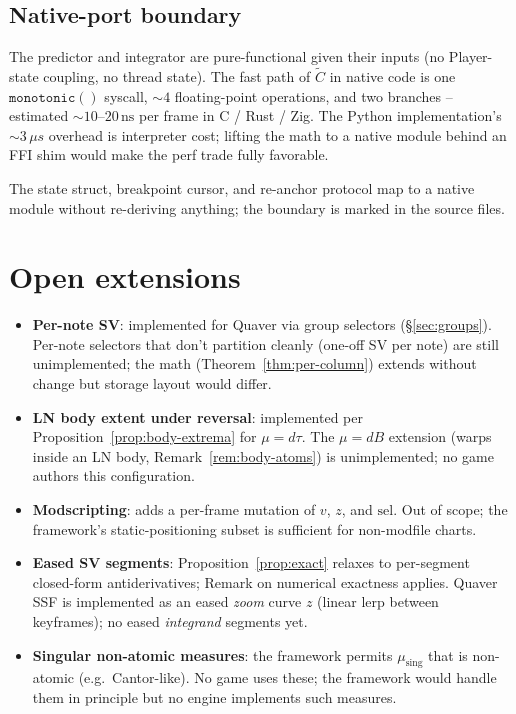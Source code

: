 \documentclass[11pt]{article}
\theoremstyle{definition}
\begin{document}
\subsection{Native-port boundary}

The predictor and integrator are pure-functional given their inputs (no
Player-state coupling, no thread state). The fast path of
$\widetilde{C}$ in native code is one
$\mathtt{monotonic()}$ syscall, $\sim 4$ floating-point operations, and
two branches -- estimated $\sim 10$--$20\,\mathrm{ns}$ per frame in
$\mathrm{C}$ / Rust / Zig. The Python implementation's $\sim 3\,\mu s$
overhead is interpreter cost; lifting the math to a native module
behind an FFI shim would make the perf trade fully favorable.

The state struct, breakpoint cursor, and re-anchor protocol map to a
native module without re-deriving anything; the boundary is marked in
the source files.

\section{Open extensions}

\begin{itemize}[leftmargin=2em]
    \item \textbf{Per-note SV}: implemented for Quaver via group
          selectors (\S\ref{sec:groups}). Per-note selectors that don't
          partition cleanly (one-off SV per note) are still
          unimplemented; the math (Theorem~\ref{thm:per-column})
          extends without change but storage layout would differ.
    \item \textbf{LN body extent under reversal}: implemented per
          Proposition~\ref{prop:body-extrema} for $\mu = d\tau$. The
          $\mu = dB$ extension (warps inside an LN body,
          Remark~\ref{rem:body-atoms}) is unimplemented; no game
          authors this configuration.
    \item \textbf{Modscripting}: adds a per-frame mutation of $v$, $z$, and
          $\mathrm{sel}$. Out of scope; the framework's static-positioning
          subset is sufficient for non-modfile charts.
    \item \textbf{Eased SV segments}: Proposition~\ref{prop:exact} relaxes to
          per-segment closed-form antiderivatives; Remark on numerical
          exactness applies. Quaver SSF is implemented as an eased
          \emph{zoom} curve $z$ (linear lerp between keyframes); no
          eased \emph{integrand} segments yet.
    \item \textbf{Singular non-atomic measures}: the framework permits
          $\mu_{\mathrm{sing}}$ that is non-atomic (e.g.\ Cantor-like).
          No game uses these; the framework would handle them in principle
          but no engine implements such measures.
\end{itemize}
\end{document}
